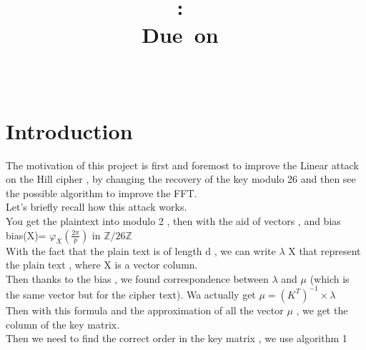 \documentclass{article}
\title{
\vspace{2in}
\textmd{\textbf{\hmwkClass:\ \hmwkTitle}}\\
\normalsize\vspace{0.1in}\small{Due\ on\ \hmwkDueDate}\\
\vspace{0.1in}\large{\textit{\hmwkClassInstructor\ \hmwkClassTime}}
\vspace{3in}
}
\author{\textbf{\hmwkAuthorName}}
\date{} %
\begin{document}
\maketitle



\newpage
\tableofcontents
\newpage



\section{Introduction}
	The motivation of this project is first and foremost to improve the Linear attack on the Hill cipher , by changing the recovery of the key modulo 26 and then see the possible algorithm to improve the FFT.\\
Let's briefly recall how this attack works.\\
You get the plaintext into modulo 2 , then with the aid of vectors , and bias \\
bias(X)= $\varphi_{X}(\frac{2\pi}{p})$ in $\mathbb{Z}/26\mathbb{Z}$\\
With the fact that the plain text is of length d , we can write $\lambda$ X that represent the plain text , where X is a vector column.\\
Then thanks to the bias , we found correspondence between $\lambda$ and $\mu$ (which is the same vector but for the cipher text). Wa actually get $ \mu = (K^T)^{-1} \times\lambda $\\
Then with this formula and the approximation of all the vector $\mu$ , we get the column of the key matrix.\\
Then we need to find the correct order in the key matrix , we use algorithm 1\\
\end{document}
